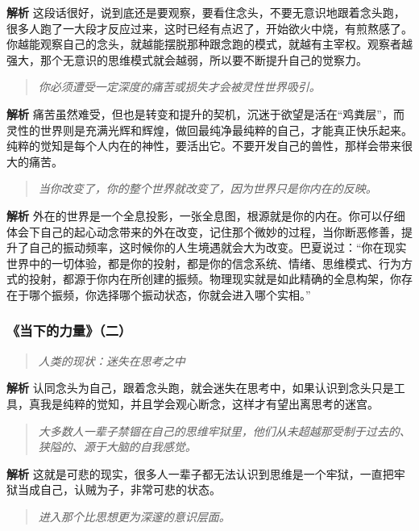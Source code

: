 \textbf{解析} 这段话很好，说到底还是要观察，要看住念头，不要无意识地跟着念头跑，很多人跑了一大段才反应过来，这时已经有点迟了，开始欲火中烧，有煎熬感了。你越能观察自己的念头，就越能摆脱那种跟念跑的模式，就越有主宰权。观察者越强大，那个无意识的思维模式就会越弱，所以要不断提升自己的觉察力。

\begin{quote}\it
    你必须遭受一定深度的痛苦或损失才会被灵性世界吸引。
\end{quote}

\textbf{解析} 痛苦虽然难受，但也是转变和提升的契机，沉迷于欲望是活在“鸡粪层”，而灵性的世界则是充满光辉和辉煌，做回最纯净最纯粹的自己，才能真正快乐起来。纯粹的觉知是每个人内在的神性，要活出它。不要开发自己的兽性，那样会带来很大的痛苦。

\begin{quote}\it
    当你改变了，你的整个世界就改变了，因为世界只是你内在的反映。
\end{quote}

\textbf{解析} 外在的世界是一个全息投影，一张全息图，根源就是你的内在。你可以仔细体会下自己的起心动念带来的外在改变，记住那个微妙的过程，当你断恶修善，提升了自己的振动频率，这时候你的人生境遇就会大为改变。巴夏说过：“你在现实世界中的一切体验，都是你的投射，都是你的信念系统、情绪、思维模式、行为方式的投射，都源于你内在所创建的振频。物理现实就是如此精确的全息构架，你存在于哪个振频，你选择哪个振动状态，你就会进入哪个实相。”

\subsubsection{《当下的力量》（二）}

\begin{quote}\it
    人类的现状：迷失在思考之中
\end{quote}

\textbf{解析} 认同念头为自己，跟着念头跑，就会迷失在思考中，如果认识到念头只是工具，真我是纯粹的觉知，并且学会观心断念，这样才有望出离思考的迷宫。

\begin{quote}\it
    大多数人一辈子禁锢在自己的思维牢狱里，他们从未超越那受制于过去的、狭隘的、源于大脑的自我感觉。
\end{quote}

\textbf{解析} 这就是可悲的现实，很多人一辈子都无法认识到思维是一个牢狱，一直把牢狱当成自己，认贼为子，非常可悲的状态。

\begin{quote}\it
    进入那个比思想更为深邃的意识层面。
\end{quote}

